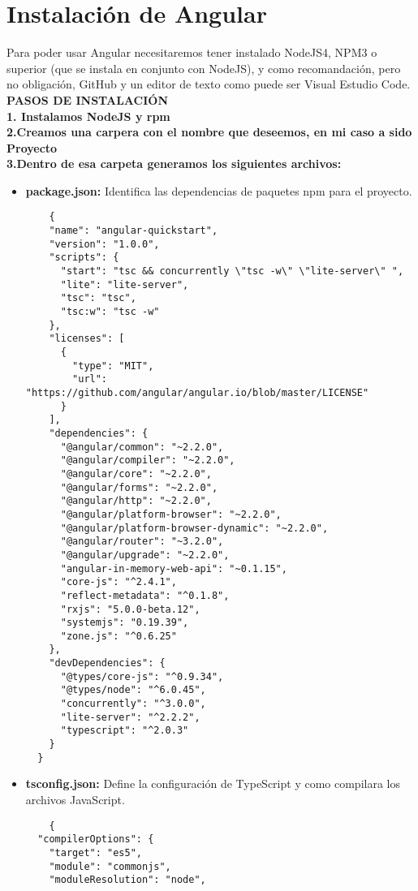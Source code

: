 \documentclass[openany]{book}
\begin{document}
\chapter{Instalación de Angular }
Para poder usar Angular necesitaremos tener instalado NodeJS4, NPM3 o superior (que se instala en conjunto con NodeJS), y como recomandación, pero no obligación, GitHub y un editor de texto como puede ser Visual Estudio Code. 
\\ \textbf{PASOS DE INSTALACIÓN}\\
\textbf{1. Instalamos NodeJS y rpm}\\
\textbf{2.Creamos una carpera con el nombre que deseemos, en mi caso a sido Proyecto\\ 3.Dentro de esa carpeta generamos los siguientes archivos:}
\begin{itemize}
  \item \textbf{package.json:} Identifica las dependencias de paquetes npm para el proyecto.
  \begin{lstlisting}
    {
    "name": "angular-quickstart",
    "version": "1.0.0",
    "scripts": {
      "start": "tsc && concurrently \"tsc -w\" \"lite-server\" ",
      "lite": "lite-server",
      "tsc": "tsc",
      "tsc:w": "tsc -w"
    },
    "licenses": [
      {
        "type": "MIT",
        "url": "https://github.com/angular/angular.io/blob/master/LICENSE"
      }
    ],
    "dependencies": {
      "@angular/common": "~2.2.0",
      "@angular/compiler": "~2.2.0",
      "@angular/core": "~2.2.0",
      "@angular/forms": "~2.2.0",
      "@angular/http": "~2.2.0",
      "@angular/platform-browser": "~2.2.0",
      "@angular/platform-browser-dynamic": "~2.2.0",
      "@angular/router": "~3.2.0",
      "@angular/upgrade": "~2.2.0",
      "angular-in-memory-web-api": "~0.1.15",
      "core-js": "^2.4.1",
      "reflect-metadata": "^0.1.8",
      "rxjs": "5.0.0-beta.12",
      "systemjs": "0.19.39",
      "zone.js": "^0.6.25"
    },
    "devDependencies": {
      "@types/core-js": "^0.9.34",
      "@types/node": "^6.0.45",
      "concurrently": "^3.0.0",
      "lite-server": "^2.2.2",
      "typescript": "^2.0.3"
    }
  }
  \end{lstlisting}
  \vspace*{5\baselineskip}
  \item \textbf{tsconfig.json:} Define la configuración de TypeScript y como compilara los archivos JavaScript.
  \begin{lstlisting}
    {
  "compilerOptions": {
    "target": "es5",
    "module": "commonjs",
    "moduleResolution": "node",

\end{lstlisting}
\end{itemize}
\end{document}
